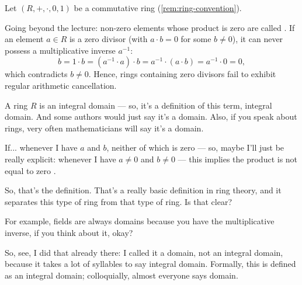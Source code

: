 \begin{content}
Let $(R, +, \cdot, 0, 1)$ be a commutative ring (\cref{rem:ring-convention}).


\begin{steps}
Going beyond the lecture: non-zero elements whose product is zero are called . If an element $a \in R$ is a zero divisor (with $a \cdot b = 0$ for some $b \neq 0$), it can never possess a multiplicative inverse $a^{-1}$:
\[
b = 1 \cdot b = (a^{-1} \cdot a) \cdot b = a^{-1} \cdot (a \cdot b) = a^{-1} \cdot 0 = 0,
\]
which contradicts $b \neq 0$. Hence, rings containing zero divisors fail to exhibit regular arithmetic cancellation.
\end{steps}
\end{content}

\begin{speech}[00:12:35 - 00:14:26]
A ring $R$ is an integral domain  --- so, it's a definition of this term, integral domain. And some authors would just say it's a domain. Also, if you speak about rings, very often mathematicians will say it's a domain.

If... whenever I have $a$ and $b$, neither of which is zero --- so, maybe I'll just be really explicit: whenever I have $a \neq 0$ and $b \neq 0$  --- this implies the product is not equal to zero .

So, that's the definition. That's a really basic definition in ring theory, and it separates this type of ring from that type of ring. Is that clear?

For example, fields are always domains  because you have the multiplicative inverse, if you think about it, okay?

So, see, I did that already there: I called it a domain, not an integral domain, because it takes a lot of syllables to say integral domain. Formally, this is defined as an integral domain; colloquially, almost everyone says domain.
\end{speech}

